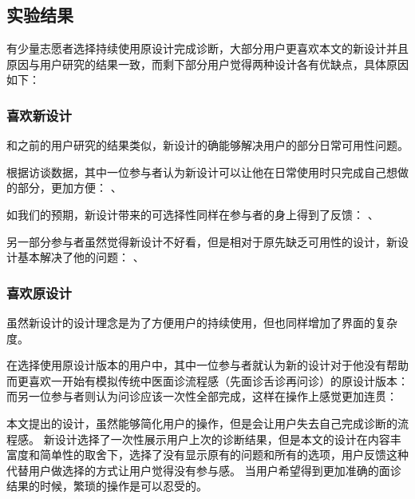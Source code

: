 \subsection{实验结果}



有少量志愿者选择持续使用原设计完成诊断，大部分用户更喜欢本文的新设计并且原因与用户研究的结果一致，而剩下部分用户觉得两种设计各有优缺点，具体原因如下：


\subsubsection{喜欢新设计}

和之前的用户研究的结果类似，新设计的确能够解决用户的部分日常可用性问题。

根据访谈数据，其中一位参与者认为新设计可以让他在日常使用时只完成自己想做的部分，更加方便：
、

如我们的预期，新设计带来的可选择性同样在参与者的身上得到了反馈：
、

另一部分参与者虽然觉得新设计不好看，但是相对于原先缺乏可用性的设计，新设计基本解决了他的问题：
、


\subsubsection{喜欢原设计}
虽然新设计的设计理念是为了方便用户的持续使用，但也同样增加了界面的复杂度。

在选择使用原设计版本的用户中，其中一位参与者就认为新的设计对于他没有帮助而更喜欢一开始有模拟传统中医面诊流程感（先面诊舌诊再问诊）的原设计版本：
而另一位参与者则认为问诊应该一次性全部完成，这样在操作上感觉更加连贯：

本文提出的设计，虽然能够简化用户的操作，但是会让用户失去自己完成诊断的流程感。
新设计选择了一次性展示用户上次的诊断结果，但是本文的设计在内容丰富度和简单性的取舍下，选择了没有显示原有的问题和所有的选项，用户反馈这种代替用户做选择的方式让用户觉得没有参与感。
当用户希望得到更加准确的面诊结果的时候，繁琐的操作是可以忍受的。


